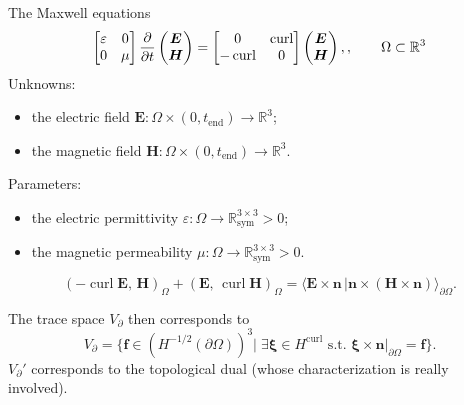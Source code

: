 \documentclass[aspectratio=169]{beamer}
\DeclareMathOperator*{\curl}{curl}
\newcommand{\bbR}{\mathbb{R}}
\newcommand{\inner}[3][]{\ensuremath{( #2, \, #3 )_{#1}}}
\newcommand{\dualpr}[3][]{\ensuremath{\langle #2 \, \vert #3 \rangle_{#1}}}
\begin{document}
\begin{frame}{The Maxwell equations}
	\begin{equation*}
		\begin{bmatrix}
			\varepsilon & 0 \\
			0 & \mu
		\end{bmatrix}\diffp{}{t}\begin{pmatrix}
			\bm{E} \\ \bm{H} 
		\end{pmatrix} = 
		\begin{bmatrix}
			0 & \curl \\
			-\curl & 0 \\
		\end{bmatrix}\begin{pmatrix}
			\bm{E} \\ \bm{H}
		\end{pmatrix}, , \qquad \Omega \subset \bbR^3
	\end{equation*}
	Unknowns:
\begin{itemize}
	\item the electric field $\bm{E} : \Omega \times (0, t_{\mathrm{end}}) \rightarrow \bbR^3$;
	\item the magnetic field $\bm{H} : \Omega \times (0, t_{\mathrm{end}}) \rightarrow \bbR^3$.
\end{itemize}
Parameters:
\begin{itemize}
	\item the electric permittivity $\varepsilon: \Omega \rightarrow \bbR^{3\times 3}_{\text{sym}}>0$;
	\item the magnetic permeability $\mu:\Omega \rightarrow \bbR^{3\times 3}_{\text{sym}} > 0$.
\end{itemize}
	\begin{equation*}
		\inner[\Omega]{-\curl \bm{E}}{\bm{H}} + \inner[\Omega]{\bm{E}}{\curl \bm{H}} = \dualpr[\partial\Omega]{\bm{E} \times \bm{n}}{\bm{n} \times (\bm{H} \times \bm{n})}.
	\end{equation*}

	The trace space $V_\partial$ then corresponds to
	\begin{equation*}
		V_\partial = \{\bm{f} \in (H^{-1/2}(\partial\Omega))^3 \vert \; \exists \bm{\xi} \in H^{\curl} \text{ s.t. } \bm{\xi}\times \bm{n}\vert_{\partial\Omega} = \bm{f}\}.
	\end{equation*}
	$V_\partial'$ corresponds to the topological dual (whose characterization is really involved). 
\end{frame}
\end{document}
